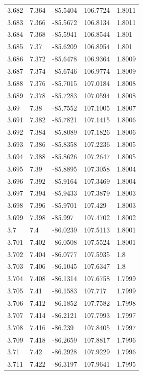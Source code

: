 \begin{tabular}{lllll}
3.682 & 7.364 & -85.5404 & 106.7724 & 1.8011 \\
3.683 & 7.366 & -85.5672 & 106.8134 & 1.8011 \\
3.684 & 7.368 & -85.5941 & 106.8544 & 1.801 \\
3.685 & 7.37 & -85.6209 & 106.8954 & 1.801 \\
3.686 & 7.372 & -85.6478 & 106.9364 & 1.8009 \\
3.687 & 7.374 & -85.6746 & 106.9774 & 1.8009 \\
3.688 & 7.376 & -85.7015 & 107.0184 & 1.8008 \\
3.689 & 7.378 & -85.7283 & 107.0594 & 1.8008 \\
3.69 & 7.38 & -85.7552 & 107.1005 & 1.8007 \\
3.691 & 7.382 & -85.7821 & 107.1415 & 1.8006 \\
3.692 & 7.384 & -85.8089 & 107.1826 & 1.8006 \\
3.693 & 7.386 & -85.8358 & 107.2236 & 1.8005 \\
3.694 & 7.388 & -85.8626 & 107.2647 & 1.8005 \\
3.695 & 7.39 & -85.8895 & 107.3058 & 1.8004 \\
3.696 & 7.392 & -85.9164 & 107.3469 & 1.8004 \\
3.697 & 7.394 & -85.9433 & 107.3879 & 1.8003 \\
3.698 & 7.396 & -85.9701 & 107.429 & 1.8003 \\
3.699 & 7.398 & -85.997 & 107.4702 & 1.8002 \\
3.7 & 7.4 & -86.0239 & 107.5113 & 1.8001 \\
3.701 & 7.402 & -86.0508 & 107.5524 & 1.8001 \\
3.702 & 7.404 & -86.0777 & 107.5935 & 1.8 \\
3.703 & 7.406 & -86.1045 & 107.6347 & 1.8 \\
3.704 & 7.408 & -86.1314 & 107.6758 & 1.7999 \\
3.705 & 7.41 & -86.1583 & 107.717 & 1.7999 \\
3.706 & 7.412 & -86.1852 & 107.7582 & 1.7998 \\
3.707 & 7.414 & -86.2121 & 107.7993 & 1.7997 \\
3.708 & 7.416 & -86.239 & 107.8405 & 1.7997 \\
3.709 & 7.418 & -86.2659 & 107.8817 & 1.7996 \\
3.71 & 7.42 & -86.2928 & 107.9229 & 1.7996 \\
3.711 & 7.422 & -86.3197 & 107.9641 & 1.7995 \\

\end{tabular}
